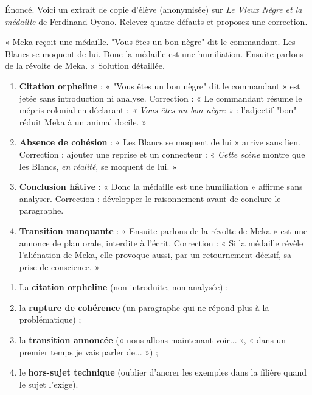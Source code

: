 \documentclass[11pt]{article}
\begin{document}
\begin{exoresolu}
Énoncé. Voici un extrait de copie d'élève (anonymisée) sur \emph{Le Vieux Nègre et la médaille} de Ferdinand Oyono. Relevez quatre défauts et proposez une correction.

« Meka reçoit une médaille. "Vous êtes un bon nègre" dit le commandant. Les Blancs se moquent de lui. Donc la médaille est une humiliation. Ensuite parlons de la révolte de Meka. »
\tcblower
Solution détaillée.
\begin{enumerate}
\item \textbf{Citation orpheline} : « "Vous êtes un bon nègre" dit le commandant » est jetée sans introduction ni analyse. Correction : « Le commandant résume le mépris colonial en déclarant : \emph{« Vous êtes un bon nègre »} : l'adjectif "bon" réduit Meka à un animal docile. »
\item \textbf{Absence de cohésion} : « Les Blancs se moquent de lui » arrive sans lien. Correction : ajouter une reprise et un connecteur : « \emph{Cette scène} montre que les Blancs, \emph{en réalité}, se moquent de lui. »
\item \textbf{Conclusion hâtive} : « Donc la médaille est une humiliation » affirme sans analyser. Correction : développer le raisonnement avant de conclure le paragraphe.
\item \textbf{Transition manquante} : « Ensuite parlons de la révolte de Meka » est une annonce de plan orale, interdite à l'écrit. Correction : « Si la médaille révèle l'aliénation de Meka, elle provoque aussi, par un retournement décisif, sa prise de conscience. »
\end{enumerate}
\end{exoresolu}

\begin{attention}
\begin{enumerate}
\item La \textbf{citation orpheline} (non introduite, non analysée) ;
\item la \textbf{rupture de cohérence} (un paragraphe qui ne répond plus à la problématique) ;
\item la \textbf{transition annoncée} (« nous allons maintenant voir... », « dans un premier temps je vais parler de... ») ;
\item le \textbf{hors-sujet technique} (oublier d'ancrer les exemples dans la filière quand le sujet l'exige).
\end{enumerate}
\end{attention}
\end{document}
